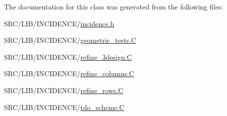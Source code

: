 The documentation for this class was generated from the following files\+:\begin{DoxyCompactItemize}
\item 
S\+R\+C/\+L\+I\+B/\+I\+N\+C\+I\+D\+E\+N\+C\+E/\mbox{\hyperlink{incidence_8h}{incidence.\+h}}\item 
S\+R\+C/\+L\+I\+B/\+I\+N\+C\+I\+D\+E\+N\+C\+E/\mbox{\hyperlink{geometric__tests_8_c}{geometric\+\_\+tests.\+C}}\item 
S\+R\+C/\+L\+I\+B/\+I\+N\+C\+I\+D\+E\+N\+C\+E/\mbox{\hyperlink{refine__3design_8_c}{refine\+\_\+3design.\+C}}\item 
S\+R\+C/\+L\+I\+B/\+I\+N\+C\+I\+D\+E\+N\+C\+E/\mbox{\hyperlink{refine__columns_8_c}{refine\+\_\+columns.\+C}}\item 
S\+R\+C/\+L\+I\+B/\+I\+N\+C\+I\+D\+E\+N\+C\+E/\mbox{\hyperlink{refine__rows_8_c}{refine\+\_\+rows.\+C}}\item 
S\+R\+C/\+L\+I\+B/\+I\+N\+C\+I\+D\+E\+N\+C\+E/\mbox{\hyperlink{tdo__scheme_8_c}{tdo\+\_\+scheme.\+C}}\end{DoxyCompactItemize}
